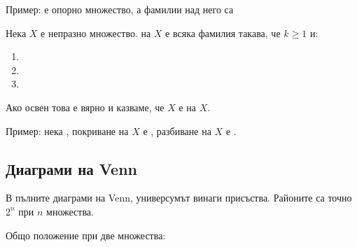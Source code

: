 Пример:  е опорно множество, а фамилии над него са 

Нека \(X\) е непразно множество.  на \(X\) е всяка фамилия 
такава, че \(k \ge 1\) и:
\begin{enumerate}
    \item {}
    \item {}
    \item {}
\end{enumerate}
Ако освен това е вярно и  казваме, 
че \(X\) е  на \(X\).

Пример: нека , покриване на \(X\) е ,
разбиване на \(X\) е .

\subsection{Диаграми на Venn}

В пълните диаграми на Venn, универсумът винаги присъства.
Районите са точно \(2^n\) при \(n\) множества.

Общо положение при две множества:



